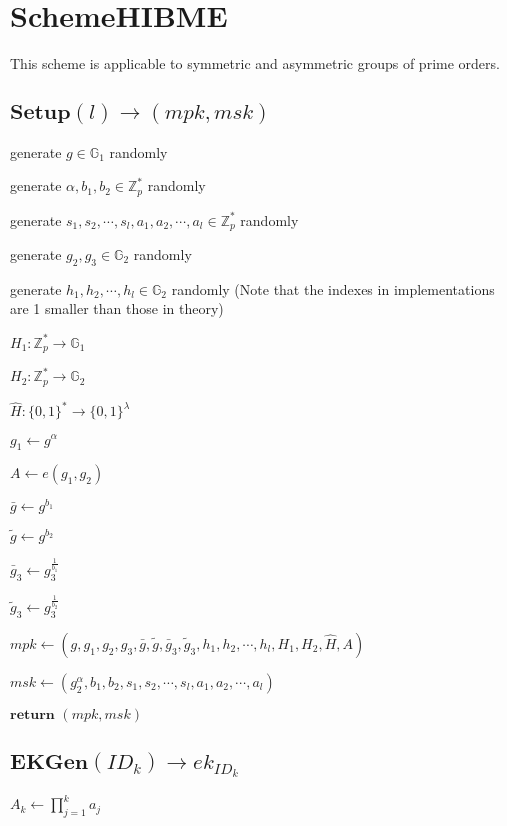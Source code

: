 \documentclass[a4paper]{article}
\begin{document}
\section{SchemeHIBME}

This scheme is applicable to symmetric and asymmetric groups of prime orders. 

\subsection{$\textbf{Setup}(l) \rightarrow (\textit{mpk}, \textit{msk})$}

generate $g \in \mathbb{G}_1$ randomly

generate $\alpha, b_1, b_2 \in \mathbb{Z}_p^*$ randomly

generate $s_1, s_2, \cdots, s_l, a_1, a_2, \cdots, a_l \in \mathbb{Z}_p^*$ randomly

generate $g_2, g_3 \in \mathbb{G}_2$ randomly

generate $h_1, h_2, \cdots, h_l \in \mathbb{G}_2$ randomly (Note that the indexes in implementations are 1 smaller than those in theory)

$H_1:\mathbb{Z}_p^* \rightarrow \mathbb{G}_1$

$H_2:\mathbb{Z}_p^* \rightarrow \mathbb{G}_2$

$\hat{H}: \{0, 1\}^* \rightarrow \{0, 1\}^\lambda$

$g_1 \gets g^\alpha$

$A \gets e(g_1, g_2)$

$\bar{g} \gets g^{b_1}$

$\tilde{g} \gets g^{b_2}$

$\bar{g}_3 \gets g_3^{\frac{1}{b_1}}$

$\tilde{g}_3 \gets g_3^{\frac{1}{b_2}}$

$\textit{mpk} \gets (g, g_1, g_2, g_3, \bar{g}, \tilde{g}, \bar{g}_3, \tilde{g}_3, h_1, h_2, \cdots, h_l, H_1, H_2, \hat{H}, A)$

$\textit{msk} \gets (g_2^\alpha, b_1, b_2, s_1, s_2, \cdots, s_l, a_1, a_2, \cdots, a_l)$

$\textbf{return }(\textit{mpk}, \textit{msk})$

\subsection{$\textbf{EKGen}(\textit{ID}_k) \rightarrow \textit{ek}_{\textit{ID}_k}$}

$A_k \gets \prod\limits_{j = 1}^k a_j$
\end{document}
